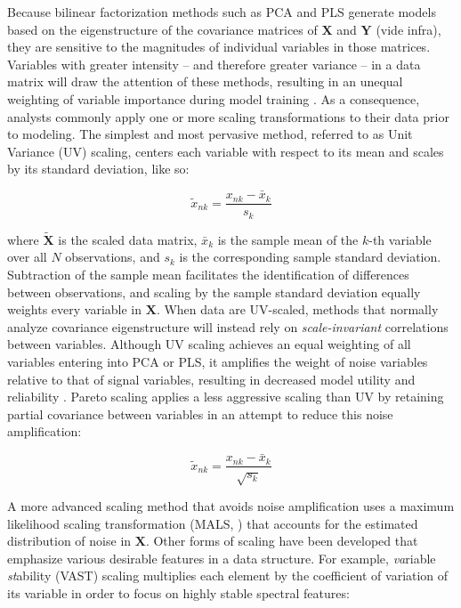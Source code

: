 \begin{doublespace}
Because bilinear factorization methods such as PCA and PLS generate models
based on the eigenstructure of the covariance matrices of $\mathbf{X}$ and
$\mathbf{Y}$ (vide infra), they are sensitive to the magnitudes of individual
variables in those matrices. Variables with greater intensity -- and therefore
greater variance -- in a data matrix will draw the attention of these methods,
resulting in an unequal weighting of variable importance during model training
\cite{jolliffe2002,smilde:anchem2005,vandenberg:bmcg2006}. As a consequence,
analysts commonly apply one or more scaling transformations to their data prior
to modeling. The simplest and most pervasive method, referred to as Unit
Variance (UV) scaling, centers each variable with respect to its mean and
scales by its standard deviation, like so:

\begin{equation}
\tilde{x}_{nk} = \frac{x_{nk} - \bar{x}_k}{s_k}
\end{equation}

where $\widetilde{\mathbf{X}}$ is the scaled data matrix, $\bar{x}_k$ is the
sample mean of the $k$-th variable over all $N$ observations, and $s_k$ is the
corresponding sample standard deviation. Subtraction of the sample mean
facilitates the identification of differences between observations, and
scaling by the sample standard deviation equally weights every variable
in $\mathbf{X}$. When data are UV-scaled, methods that normally analyze
covariance eigenstructure will instead rely on {\it scale-invariant}
correlations between variables. Although UV scaling achieves an equal weighting
of all variables entering into PCA or PLS, it amplifies the weight of noise
variables relative to that of signal variables, resulting in decreased model
utility and reliability \cite{hoefsloot:jchemo2006}. Pareto scaling applies a
less aggressive scaling than UV by retaining partial covariance between
variables in an attempt to reduce this noise amplification:

\begin{equation}
\tilde{x}_{nk} = \frac{x_{nk} - \bar{x}_k}{\sqrt{s_k}}
\end{equation}

A more advanced scaling method that avoids noise amplification uses a maximum
likelihood scaling transformation (MALS, \cite{hoefsloot:jchemo2006}) that
accounts for the estimated distribution of noise in $\mathbf{X}$. Other forms
of scaling have been developed that emphasize various desirable features in
a data structure. For example, {\it va}riable {\it st}ability (VAST) scaling
multiplies each element by the coefficient of variation of its variable in
order to focus on highly stable spectral features:


\end{doublespace}
